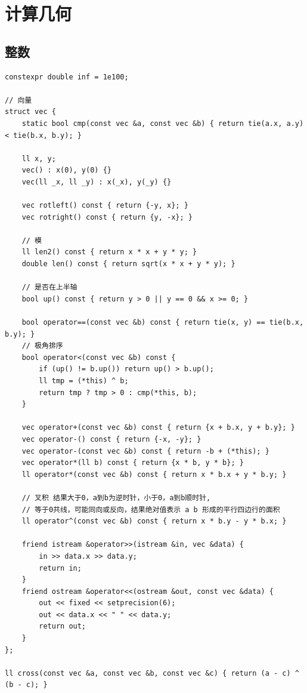 \documentclass[UTF8, twoside]{ctexart}
\begin{document}
\begin{sloppypar}
\clearpage

\section{计算几何}

\subsection{整数}

\begin{lstlisting}[style=cpp]
constexpr double inf = 1e100;

// 向量
struct vec {
    static bool cmp(const vec &a, const vec &b) { return tie(a.x, a.y) < tie(b.x, b.y); }

    ll x, y;
    vec() : x(0), y(0) {}
    vec(ll _x, ll _y) : x(_x), y(_y) {}

    vec rotleft() const { return {-y, x}; }
    vec rotright() const { return {y, -x}; }

    // 模
    ll len2() const { return x * x + y * y; }
    double len() const { return sqrt(x * x + y * y); }

    // 是否在上半轴
    bool up() const { return y > 0 || y == 0 && x >= 0; }

    bool operator==(const vec &b) const { return tie(x, y) == tie(b.x, b.y); }
    // 极角排序
    bool operator<(const vec &b) const {
        if (up() != b.up()) return up() > b.up();
        ll tmp = (*this) ^ b;
        return tmp ? tmp > 0 : cmp(*this, b);
    }

    vec operator+(const vec &b) const { return {x + b.x, y + b.y}; }
    vec operator-() const { return {-x, -y}; }
    vec operator-(const vec &b) const { return -b + (*this); }
    vec operator*(ll b) const { return {x * b, y * b}; }
    ll operator*(const vec &b) const { return x * b.x + y * b.y; }

    // 叉积 结果大于0，a到b为逆时针，小于0，a到b顺时针,
    // 等于0共线，可能同向或反向，结果绝对值表示 a b 形成的平行四边行的面积
    ll operator^(const vec &b) const { return x * b.y - y * b.x; }

    friend istream &operator>>(istream &in, vec &data) {
        in >> data.x >> data.y;
        return in;
    }
    friend ostream &operator<<(ostream &out, const vec &data) {
        out << fixed << setprecision(6);
        out << data.x << " " << data.y;
        return out;
    }
};

ll cross(const vec &a, const vec &b, const vec &c) { return (a - c) ^ (b - c); }


\end{lstlisting}
\end{sloppypar}
\end{document}
